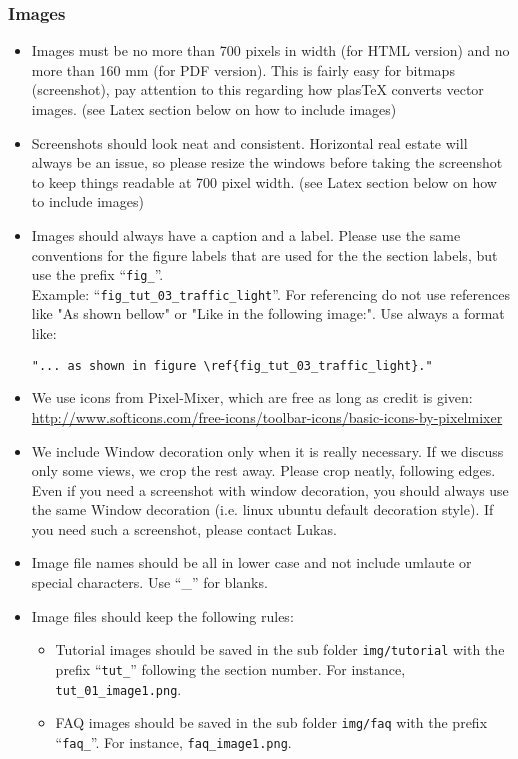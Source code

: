 \subsubsection{Images}
\begin{itemize}
	\item Images must be no more than 700 pixels in width (for HTML version) and no more than 160 mm (for PDF version). This is fairly easy for bitmaps (screenshot), pay attention to this regarding how plasTeX converts vector images. (see Latex section below on how to include images)

	\item Screenshots should look neat and consistent.  Horizontal real estate will always be an issue, so please resize the windows before taking the screenshot to keep things readable at 700 pixel width.  (see Latex section below on how to include images)

	\item Images should always have a caption and a label. Please use the same conventions for the figure labels that are used for the the section labels, but use the prefix ``\texttt{fig\_}''. \\Example: ``\texttt{fig\_tut\_03\_traffic\_light}''. For referencing do not use references like "As shown bellow" or "Like in the following image:". Use always a format like:

\begin{verbatim}"... as shown in figure \ref{fig_tut_03_traffic_light}."\end{verbatim}

	\item We use icons from Pixel-Mixer, which are free as long as credit is given: \url{http://www.softicons.com/free-icons/toolbar-icons/basic-icons-by-pixelmixer}

  \item We include Window decoration only when it is really necessary.  If we discuss only some views, we crop the rest away.  Please crop neatly, following edges. Even if you need a screenshot with window decoration, you should always use the same Window decoration (i.e. linux ubuntu default decoration style). If you need such a screenshot, please contact Lukas.

  \item Image file names should be all in lower case and not include umlaute or special characters. Use ``\_'' for blanks.

  \item Image files should keep the following rules:
	
\begin{itemize}
		\item Tutorial images should be saved in the sub folder \texttt{img/tutorial} with the prefix ``\texttt{tut\_}'' following the section number. For instance, \texttt{tut\_01\_image1.png}.

		\item FAQ images should be saved in the sub folder \texttt{img/faq} with the prefix ``\texttt{faq\_}''. For instance, \texttt{faq\_image1.png}.

	\end{itemize} 
	\end{itemize}

